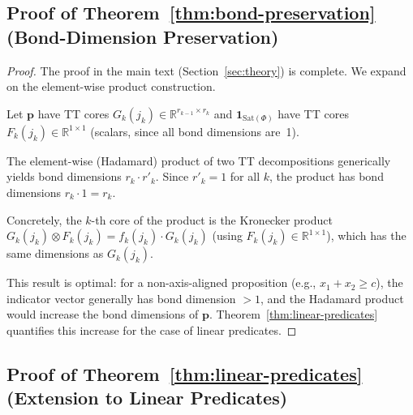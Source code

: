 \documentclass[11pt]{article}
\newcommand{\R}{\mathbb{R}}
\newcommand{\Sat}{\mathrm{Sat}}
\begin{document}
\subsection{Proof of Theorem~\ref{thm:bond-preservation}
  (Bond-Dimension Preservation)}

\begin{proof}
The proof in the main text (Section~\ref{sec:theory}) is complete.
We expand on the element-wise product construction.

Let $\mathbf{p}$ have TT cores $G_k(j_k) \in \R^{r_{k-1}\times r_k}$
and $\mathbf{1}_{\Sat(\Phi)}$ have TT cores
$F_k(j_k) \in \R^{1 \times 1}$ (scalars, since all bond dimensions
are~1).

The element-wise (Hadamard) product of two TT decompositions
generically yields bond dimensions $r_k \cdot r'_k$.
Since $r'_k = 1$ for all $k$, the product has bond dimensions
$r_k \cdot 1 = r_k$.

Concretely, the $k$-th core of the product is the Kronecker product
$G_k(j_k) \otimes F_k(j_k) = f_k(j_k) \cdot G_k(j_k)$
(using $F_k(j_k) \in \R^{1\times 1}$),
which has the same dimensions as $G_k(j_k)$.

This result is optimal: for a non-axis-aligned proposition
(e.g., $x_1 + x_2 \geq c$), the indicator vector generally has
bond dimension $> 1$, and the Hadamard product would increase
the bond dimensions of $\mathbf{p}$.
Theorem~\ref{thm:linear-predicates} quantifies this increase for
the case of linear predicates.
\end{proof}

\subsection{Proof of Theorem~\ref{thm:linear-predicates}
  (Extension to Linear Predicates)}
\end{document}
